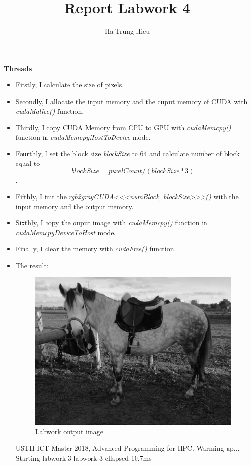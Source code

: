 \documentclass{article}
\title{Report Labwork 4}
\author{Ha Trung Hieu}
\begin{document}
\maketitle

\textbf{Threads}

\begin{itemize}
	\item Firstly, I calculate the size of pixels.
		
	\item Secondly, I allocate the input memory and the ouput memory of CUDA with \textit{cudaMalloc()} function.
	\item Thirdly, I copy CUDA Memory from CPU to GPU with \textit{cudaMemcpy()} function in \textit{cudaMemcpyHostToDevice} mode.
	\item Fourthly, I set the block size \textit{blockSize} to 64 and calculate number of block equal to \[blockSize = pixelCount / (blockSize * 3)\].
	\item Fifthly, I init the \textit{rgb2grayCUDA<<<numBlock, blockSize>>>()} with the input memory and the output memory.
	\item Sixthly, I copy the ouput image with \textit{cudaMemcpy()} function in \textit{cudaMemcpyDeviceToHost} mode.
	\item Finally, I clear the memory with \textit{cudaFree()} function.
	\item The result:\newline
	\begin{figure}[ht]
	\centering
	\includegraphics[width=.8\textwidth]{labwork4-gpu-out.jpg}
	\caption{Labwork output image}
	\label{fig:cat_laptop}
	\end{figure}
	
	USTH ICT Master 2018, Advanced Programming for HPC.\newline
    Warming up...\newline
    Starting labwork 3\newline
    labwork 3 ellapsed 10.7ms\newline
\end{itemize}
\end{document}
